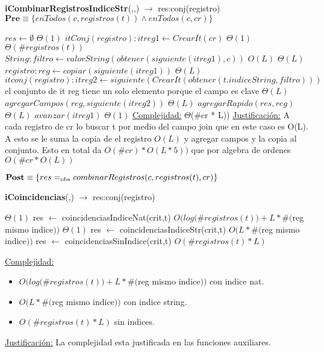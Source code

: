 \begin{algorithm}[H]{\textbf{iCombinarRegistrosIndiceStr}(,,) $\to$ res:conj(registro)}
	{\\ $\textbf{Pre} \equiv \{enTodos(c,registros(t)) \land enTodos(c,cr)\}$}
	\begin{algorithmic}[1]
		\State $res \gets \emptyset$ \Comment $\Theta(1)$
		\State $itConj(registro): itreg1 \gets CrearIt(cr)$ \Comment	$\Theta(1)$
		 \Comment $\Theta(\#registros(t))$
			\State $String: filtro \gets valorString(obtener(siguiente(itreg1),c))$ \Comment $O(L)$
			 \Comment $\Theta(L)$
				\State $registro: reg \gets copiar(siguiente(itreg1))$ \Comment $\Theta(L)$
				\State $itconj(registro): itreg2 \gets siguiente(CrearIt(obtener(t.indiceString,filtro)))$ \Comment el conjunto de it reg tiene un solo elemento porque el campo es clave $\Theta(L)$
				\State $agregarCampos(reg,siguiente(itreg2))$	\Comment $\Theta(L)$
				\State $agregarRapido(res,reg)$	\Comment $\Theta(L)$
			\EndIf
			\State $avanzar(itreg1)$	\Comment $\Theta(1)$
		\EndWhile
		\medskip
		\Statex \underline{Complejidad:} $\Theta$($\#$cr * L))
		\Statex \underline{Justificación:} A cada registro de cr lo buscar t por medio del campo join que en este caso es O(L). A esto se le suma la copia de el registro $O(L)$ y agregar campos y la copia al conjunto. Esto en total da $O(\#cr) * O(L*5))$ que por algebra de ordenes $O(\#cr * O(L))$
	\end{algorithmic}
	{$\textbf{Post} \equiv \{res =_{\mathrm{obs}} combinarRegistros(c,registros(t),cr)\}$}
\end{algorithm}


\begin{algorithm}[H]{\textbf{iCoincidencias}(,) $\to$ res:conj(registro)}
	\begin{algorithmic}[1]
		 \Comment $\Theta(1)$
			\State res $\gets$ coincidenciasIndiceNat(crit,t) \Comment $O(log ($\#$registros(t)) + L * \#($reg mismo indice$))$
		\Else
			 \Comment $\Theta(1)$
				\State res $\gets$ coincidenciasIndiceStr(crit,t) \Comment $O(L * \#($reg mismo indice$))$	
			\Else
				\State res $\gets$ coincidenciasSinIndice(crit,t)  \Comment $O(\#registros(t) * L)$
			\EndIf
		\EndIf

		\medskip
		\Statex \underline{Complejidad:} 
		\begin{itemize}
		\item $O(log ($\#$registros(t)) + L * \#($reg mismo indice$))$ con indice nat.
		\item $O(L * \#($reg mismo indice$))$	con indice string.
		\item $O(\#registros(t) * L)$	sin indices.
		\end{itemize}
		\Statex \underline{Justificación:} La complejidad esta justificada en las funciones auxiliares.
	\end{algorithmic}
\end{algorithm}

